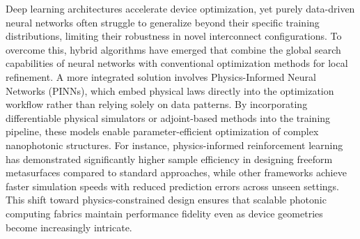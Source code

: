 Deep learning architectures accelerate device optimization, yet purely data-driven neural networks often struggle to generalize beyond their specific training distributions, limiting their robustness in novel interconnect configurations. To overcome this, hybrid algorithms have emerged that combine the global search capabilities of neural networks with conventional optimization methods for local refinement. A more integrated solution involves Physics-Informed Neural Networks (PINNs), which embed physical laws directly into the optimization workflow rather than relying solely on data patterns. \citep{doi_10_1038_s41467_025_64624_3_42144da5} \citep{doi_10_3390_s25196242_b7203a7f} By incorporating differentiable physical simulators or adjoint-based methods into the training pipeline, these models enable parameter-efficient optimization of complex nanophotonic structures. For instance, physics-informed reinforcement learning has demonstrated significantly higher sample efficiency in designing freeform metasurfaces compared to standard approaches, while other frameworks achieve faster simulation speeds with reduced prediction errors across unseen settings. This shift toward physics-constrained design ensures that scalable photonic computing fabrics maintain performance fidelity even as device geometries become increasingly intricate. \citep{doi_10_1021_acsphotonics_2c00968_06a2e96b} \citep{s2_037e66f37189104d61c0d000de0cee202b7eec9e_d15b8018} \citep{doi_10_1515_nanoph_2023_0852_cb27a26f} \citep{doi_10_48550_arxiv_2209_10098_b3bedb78}

